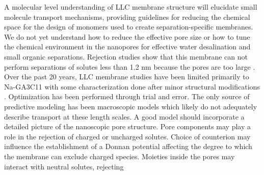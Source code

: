 A molecular level understanding of LLC membrane structure will elucidate
small molecule transport mechanisms, providing guidelines for reducing the
chemical space for the design of monomers used to create separation-specific
membranes. We do not yet understand how to reduce the effective pore
size or how to tune the chemical environment in the 
nanopores for effective water desalination and small organic separations.
Rejection studies show that this membrane can not perform separations of solutes less than 1.2 nm  
because the pores are too large \cite{zhou_supported_2005}. Over the past
20 years, LLC membrane studies have been limited primarily 
to Na-GA3C11 with some characterization done after minor structural 
modifications \cite{resel_structural_2000}. Optimization has been 
performed through trial and error. The only source of predictive modeling  %
has been macroscopic models which likely do not adequately describe 
transport at these length scales. A good model should incorporate a 
detailed picture of the nanoscopic pore structure. Pore components may 
play a role in the rejection of charged or uncharged solutes. Choice of 
counterion may influence the establishment of a Donnan potential
affecting the degree to which the membrane can exclude charged species.
Moieties inside the pores may interact with neutral solutes, rejecting
